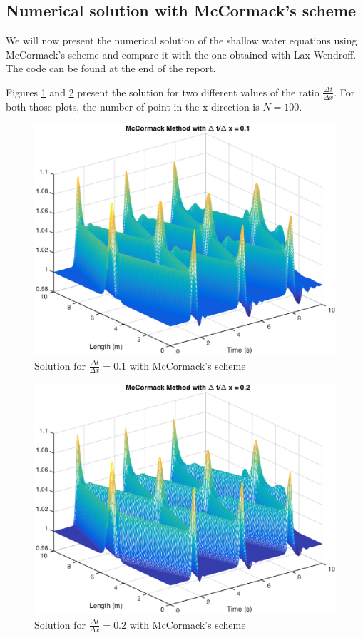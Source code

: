 \subsection{Numerical solution with McCormack's scheme}
We will now present the numerical solution of the shallow water equations using McCormack's scheme and compare it with the one obtained with Lax-Wendroff. The code can be found at the end of the report.

Figures \ref{mc01} and \ref{mc02} present the solution for two different values of the ratio $\frac{\Delta t}{\Delta x}$. For both those plots, the number of point in the x-direction is $N=100$.

\begin{figure}
\begin{center}
\includegraphics[scale=0.6]{mccormack01.eps}
\caption{Solution for $\frac{\Delta t}{\Delta x}= 0.1$ with McCormack's scheme}
\label{mc01}
\end{center}
\end{figure}

\begin{figure}
\begin{center}
\includegraphics[scale=0.6]{mccormack02.eps}
\caption{Solution for $\frac{\Delta t}{\Delta x}= 0.2$ with McCormack's scheme}
\label{mc02}
\end{center}
\end{figure}

